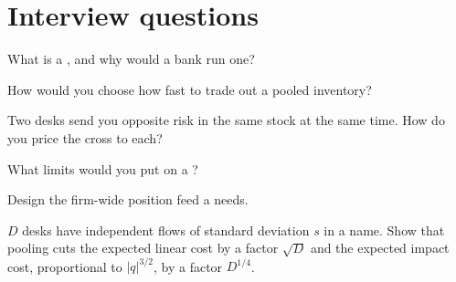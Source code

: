 \section{Interview questions}

\begin{interviewq}\label{iq:s2:the-central-risk-book:1}
What is a , and why would a bank run one?
\end{interviewq}

\begin{interviewq}\label{iq:s2:the-central-risk-book:2}
How would you choose how fast to trade out a pooled inventory?
\end{interviewq}

\begin{interviewq}\label{iq:s2:the-central-risk-book:3}
Two desks send you opposite risk in the same stock at the same time. How do you price the cross to each?
\end{interviewq}

\begin{interviewq}\label{iq:s2:the-central-risk-book:4}
What limits would you put on a ?
\end{interviewq}

\begin{interviewq}\label{iq:s2:the-central-risk-book:5}
Design the firm-wide position feed a  needs.
\end{interviewq}

\begin{interviewq}\label{iq:s2:the-central-risk-book:6}
$D$ desks have independent flows of standard deviation $s$ in a name. Show that pooling cuts the expected linear cost by a factor $\sqrt D$ and
the expected impact cost, proportional to $|q|^{3/2}$, by a factor $D^{1/4}$.
\end{interviewq}
